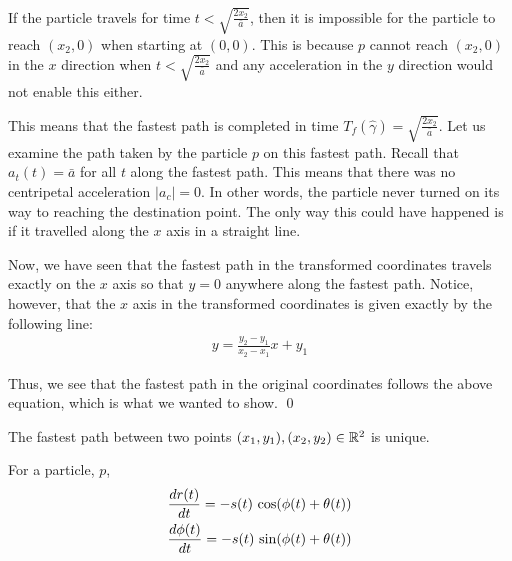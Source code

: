If the particle travels for time $t < \sqrt{\frac{2 x_2}{\bar{a}}}$, then it is impossible for the particle to reach $(x_2, 0)$ when starting at $(0,0)$. This is because $p$ cannot reach $(x_2, 0)$ in the $x$ direction when $t < \sqrt{\frac{2 x_2}{\bar{a}}}$ and any acceleration in the $y$ direction would not enable this either.

This means that the fastest path is completed in time $T_f(\hat{\gamma}) = \sqrt{\frac{2 x_2}{\bar{a}}}$. Let us examine the path taken by the particle $p$ on this fastest path. Recall that $a_t(t) = \bar{a}$ for all $t$ along the fastest path. This means that there was no centripetal acceleration $|a_c| = 0$. In other words, the particle never turned on its way to reaching the destination point. The only way this could have happened is if it travelled along the $x$ axis in a straight line.

Now, we have seen that the fastest path in the transformed coordinates travels exactly on the $x$ axis so that $y = 0$ anywhere along the fastest path. Notice, however, that the $x$ axis in the transformed coordinates is given exactly by the following line:
\begin{eqnarray}
  y = \frac{y_2 - y_1}{x_2 - x_1} x + y_1
\end{eqnarray}

Thus, we see that the fastest path in the original coordinates follows the above equation, which is what we wanted to show.
\qed


\begin{corollary}
  The fastest path between two points $(x_1, y_1), (x_2, y_2) \in \mathbb R^2$ is unique.
\end{corollary}



\begin{lemma}
  For a particle, $p$,
  \begin{align*}
    \frac{dr(t)}{dt} = -s(t) \, \cos\paren{\phi(t) + \theta(t)}\\
    \frac{d\phi(t)}{dt} = -s(t) \, \sin\paren{\phi(t) + \theta(t)}
  \end{align*}
\end{lemma}

